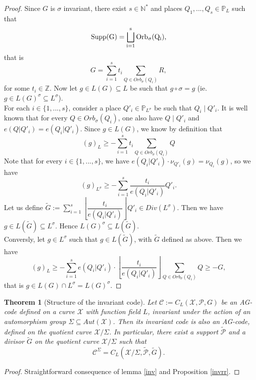 \documentclass[10pt]{article}
\newtheorem{thm}{Theorem}[]
\newcommand{\s}{\vspace{0.3cm}}
\newcommand{\cd}{\cdot}
\newcommand{\N}{\mathbb{N}}
\newcommand{\Z}{\mathbb{Z}}
\newcommand{\su}{\subseteq}
\newcommand{\X}{\mathcal{X}}
\newcommand{\PR}{\mathcal{P}}
\begin{document}
\begin{proof}
Since $G$ is $\sigma$ invariant, there exist $s \in \N^*$ and places $Q_1,...,Q_s \in \mathbb{P}_L$ such that 
\[\rm{Supp(G)} = \bigsqcup_{i=1}^s Orb_{\sigma}(Q_i),\]
that is 
\[G = \sum\limits_{i=1}^s t_i \sum\limits_{Q \in Orb_{\sigma}(Q_i)} R,\]
for some $t_i \in \Z$. Now let $g \in L(G) \su L$ be such that $g \circ \sigma = g$ (ie. $g \in L(G)^{\sigma} \su L^{\sigma}$). \\
For each $i \in \{1,...,s\}$, consider a place $Q'_i \in \mathbb{P}_{L^{\sigma}}$ be such that $Q_i \mid Q'_i$. It is well known that for every $Q \in Orb_{\sigma}(Q_i)$, one also have $Q \mid Q'_i$ and $e(Q|Q'_i)=e(Q_i|Q'_i)$. Since $g \in L(G)$, we know by definition that
\[(g)_L \geq - \sum\limits_{i=1}^s t_i \sum\limits_{Q \in Orb_{\sigma}(Q_i)} Q\]
Note that for every $i \in \{1,...,s\}$, we have $e(Q_i|Q'_i) \cd \nu_{Q'_i}(g) = \nu_{Q_i}(g)$, so we have 
\[(g)_{L^{\sigma}} \geq - \sum\limits_{i=1}^s \dfrac{t_i}{e(Q_i|Q'_i)}  Q'_i.\]
Let us define $\tilde{G}:= \sum\limits_{i=1}^s \left\lfloor\dfrac{t_i}{e(Q_i|Q'_i)}\right\rfloor  Q'_i \in Div(L^{\sigma})$. Then we have $g \in L(\tilde{G}) \su L^{\sigma}$. Hence $L(G)^{\sigma} \su L(\tilde{G})$. \\
Conversly, let $g \in L^{\sigma}$ such that $g \in L(\tilde{G})$, with $\tilde{G}$ defined as above. Then we have 
\[ (g)_L \geq -\sum\limits_{i=1}^s e(Q_i|Q'_i) \cd \left\lfloor\dfrac{t_i}{e(Q_i|Q'_i)}\right\rfloor \sum\limits_{Q \in Orb_{\sigma}(Q_i)} Q \geq -G,\]
that is $g \in L(G) \cap L^{\sigma} = L(G)^{\sigma}$.
\end{proof}

\s

\begin{thm} [Structure of the invariant code] \label{invstruct}
Let $\mathcal{C} := C_L(\X,\PR,G)$ be an AG-code defined on a curve $\X$ with function field $L$, invariant under the action of an automorphism group $\Sigma \su Aut(\X)$. Then its invariant code is also an AG-code, defined on the quotient curve $\X/\Sigma$. In particular, there exist a support $\tilde{\PR}$ and a divisor $\tilde{G}$ on the quotient curve $\X/\Sigma$ such that
\[\mathcal{C}^{\Sigma} = C_L(\X/\Sigma,\tilde{\PR},\tilde{G}).\]
\end{thm}

\s
 
\begin{proof}
Straightforward consequence of lemma \ref{inv} and Proposition \ref{invrr}.
\end{proof}
\end{document}
